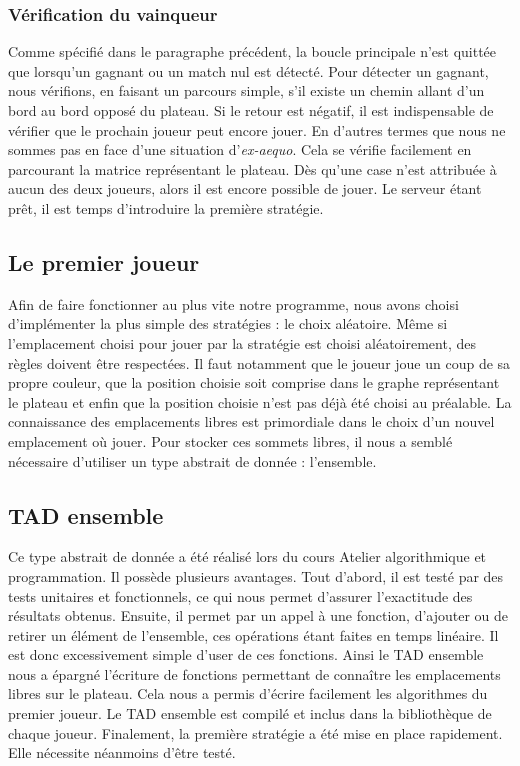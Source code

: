 \documentclass[a4paper, 12pt]{article}
\begin{document}
\subsubsection{Vérification du vainqueur}
Comme spécifié dans le paragraphe précédent, la boucle principale n'est quittée que lorsqu'un gagnant ou un match nul est détecté. Pour détecter un gagnant, nous vérifions, en faisant un parcours simple, s'il existe un chemin allant d'un bord au bord opposé du plateau. Si le retour est négatif, il est indispensable de vérifier que le prochain joueur peut encore jouer. En d'autres termes que nous ne sommes pas en face d'une situation d'\textit{ex-aequo}. Cela se vérifie facilement en parcourant la matrice représentant le plateau. Dès qu'une case n'est attribuée à aucun des deux joueurs, alors il est encore possible de jouer. Le serveur étant prêt, il est temps d'introduire la première stratégie.

\subsection{Le premier joueur}
Afin de faire fonctionner au plus vite notre programme, nous avons choisi d'implémenter la plus simple des stratégies : le choix aléatoire. Même si l'emplacement choisi pour jouer par la stratégie est choisi aléatoirement, des règles doivent être respectées. Il faut notamment que le joueur joue un coup de sa propre couleur, que la position choisie soit comprise dans le graphe représentant le plateau et enfin que la position choisie n'est pas déjà été choisi au préalable. La connaissance des emplacements libres est primordiale dans le choix d'un nouvel emplacement où jouer. Pour stocker ces sommets libres, il nous a semblé nécessaire d'utiliser un type abstrait de donnée : l'ensemble.

\subsection{TAD ensemble}
Ce type abstrait de donnée a été réalisé lors du cours Atelier algorithmique et programmation. Il possède plusieurs avantages. Tout d'abord, il est testé par des tests unitaires et fonctionnels, ce qui nous permet d'assurer l'exactitude des résultats obtenus. Ensuite, il permet par un appel à une fonction, d'ajouter ou de retirer un élément de l'ensemble, ces opérations étant faites en temps linéaire. Il est donc excessivement simple d'user de ces fonctions. Ainsi le TAD ensemble nous a épargné l'écriture de fonctions permettant de connaître les emplacements libres sur le plateau. Cela nous a permis d'écrire facilement les algorithmes du premier joueur. Le TAD ensemble est compilé et inclus dans la bibliothèque de chaque joueur. Finalement, la première stratégie a été mise en place rapidement. Elle nécessite néanmoins d'être testé.
\end{document}
